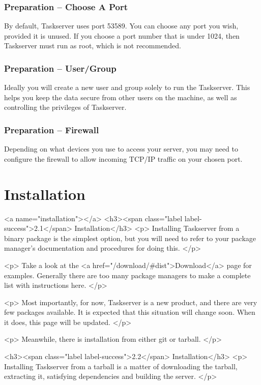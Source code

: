 \documentclass[t,handout]{beamer}
\begin{document}
\begin{frame}[fragile]\frametitle{Preparation -- Choose A  Port}

	By default, Taskserver uses port 53589. You can choose any port you wish, provided it is unused. If you choose a port number that is under 1024, then Taskserver must run as root, which is not recommended.

\end{frame}

\begin{frame}[fragile]\frametitle{Preparation -- User/Group}
  Ideally you will create a new user and group solely to run the
  Taskserver. This helps you keep the data secure from other users
  on the machine, as well as controlling the privileges of
  Taskserver.
\end{frame}

\begin{frame}[fragile]\frametitle{Preparation -- Firewall}
  Depending on what devices you use to access your server, you may
  need to configure the firewall to allow incoming TCP/IP traffic on
  your chosen port.
\end{frame}


\section{Installation}

\iffalse
<a name="installation"></a>
<h3><span class="label label-success">2.1</span> Installation</h3>
<p>
  Installing Taskserver from a binary package is the simplest
  option, but you will need to refer to your package manager's
  documentation and procedures for doing this.
</p>

<p>
  Take a look at the
  <a href="/download/#dist">Download</a> page
  for examples.  Generally there are too many package managers to
  make a complete list with instructions here.
</p>

<p>
  Most importantly, for now, Taskserver is a new product, and there
  are very few packages available.  It is expected that this
  situation will change soon.  When it does, this page will be updated.
</p>

<p>
  Meanwhile, there is installation from either git or tarball.
</p>


<h3><span class="label label-success">2.2</span> Installation</h3>
<p>
  Installing Taskserver from a tarball is a matter of downloading
  the tarball, extracting it, satisfying dependencies and building
  the server.
</p>
\end{document}
